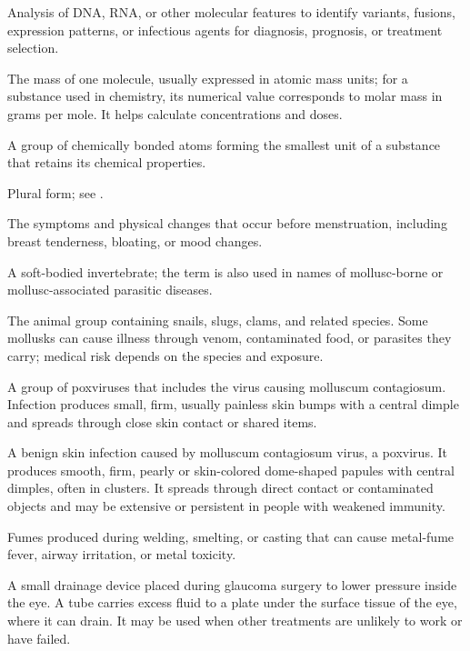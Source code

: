  Analysis of DNA, RNA, or other molecular features to identify variants, fusions, expression patterns, or infectious agents for diagnosis, prognosis, or treatment selection.

 The mass of one molecule, usually expressed in atomic mass units; for a substance used in chemistry, its numerical value corresponds to molar mass in grams per mole. It helps calculate concentrations and doses.

 A group of chemically bonded atoms forming the smallest unit of a substance that retains its chemical properties.

 Plural form; see .

 The symptoms and physical changes that occur before menstruation, including breast tenderness, bloating, or mood changes.

 A soft-bodied invertebrate; the term is also used in names of mollusc-borne or mollusc-associated parasitic diseases.

 The animal group containing snails, slugs, clams, and related species. Some mollusks can cause illness through venom, contaminated food, or parasites they carry; medical risk depends on the species and exposure.

 A group of poxviruses that includes the virus causing molluscum contagiosum. Infection produces small, firm, usually painless skin bumps with a central dimple and spreads through close skin contact or shared items.

 A benign skin infection caused by molluscum contagiosum virus, a poxvirus. It produces smooth, firm, pearly or skin-colored dome-shaped papules with central dimples, often in clusters. It spreads through direct contact or contaminated objects and may be extensive or persistent in people with weakened immunity.

 Fumes produced during welding, smelting, or casting that can cause metal-fume fever, airway irritation, or metal toxicity.

 A small drainage device placed during glaucoma surgery to lower pressure inside the eye. A tube carries excess fluid to a plate under the surface tissue of the eye, where it can drain. It may be used when other treatments are unlikely to work or have failed.

